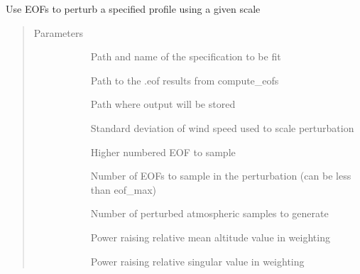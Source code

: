 \documentclass[letterpaper,10pt,english]{sphinxmanual}
\begin{document}
\begin{fulllineitems}
\label{\detokenize{stochprop.eofs:stochprop.eofs.perturb_atmo}}
\sphinxAtStartPar
Use EOFs to perturb a specified profile using a given scale
\begin{quote}\begin{description}
\item[{Parameters}] \leavevmode\begin{description}
\item[{}] \leavevmode
\sphinxAtStartPar
Path and name of the specification to be fit

\item[{}] \leavevmode
\sphinxAtStartPar
Path to the .eof results from compute\_eofs

\item[{}] \leavevmode
\sphinxAtStartPar
Path where output will be stored

\item[{}] \leavevmode
\sphinxAtStartPar
Standard deviation of wind speed used to scale perturbation

\item[{}] \leavevmode
\sphinxAtStartPar
Higher numbered EOF to sample

\item[{}] \leavevmode
\sphinxAtStartPar
Number of EOFs to sample in the perturbation (can be less than eof\_max)

\item[{}] \leavevmode
\sphinxAtStartPar
Number of perturbed atmospheric samples to generate

\item[{}] \leavevmode
\sphinxAtStartPar
Power raising relative mean altitude value in weighting

\item[{}] \leavevmode
\sphinxAtStartPar
Power raising relative singular value in weighting

\end{description}

\end{description}\end{quote}

\end{fulllineitems}
\end{document}
